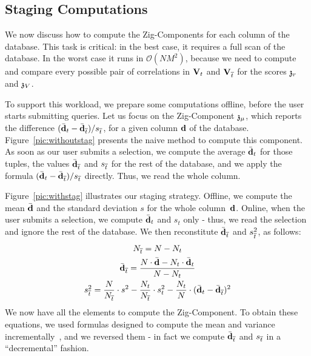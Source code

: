 \subsection{Staging Computations}
\label{sec:optimization}
We now discuss how to compute the Zig-Components for each column of the
database. This task is critical: in the best case, it requires a full scan of
the database. In the worst case it runs in $\mathcal{O}(NM^2)$, because
we need to compute and compare every possible pair of correlations in
$\mathbf{V}_t$ and $\mathbf{V}_{\overline{t}}$ for the scores $\mathfrak{z}_r$ and $\mathfrak{z}_V$.

To support this workload, we prepare some computations offline, before the user
starts submitting queries.  Let us focus on the Zig-Component $\mathfrak{z}_\mu$,
which reports the difference $(\bar{\bf{d}}_t -
\bar{\bf{d}}_{\overline{t}})/{s_{\overline{t}}}$, for a given column $\bf{d}$ of the
database.  Figure~\ref{pic:withoutstag} presents the naive method to compute
this component.  As soon as our user submits a selection, we compute the
average $\bar{\bf{d}}_t$ for those tuples, the values $\bar{\bf{d}}_{\overline{t}}$
and $s_{\overline{t}}$ for the rest of the database, and we apply the formula
$(\bar{\bf{d}}_t - \bar{\bf{d}}_{\overline{t}})/{s_{\overline{t}}}$ directly. Thus, we read
the whole column.

Figure~\ref{pic:withstag} illustrates our staging strategy. Offline, we compute
the mean $\bar{\bf{d}}$ and the standard deviation $s$ for the whole
column~$\bf{d}$. Online, when the user submits a selection, we compute
$\bar{\bf{d}}_t$ and $s_t$
only - thus, we read the selection and ignore the rest of the database. We then
reconstitute $\bar{\bf{d}}_{\overline{t}}$ and $s_{\overline{t}}^2$, as follows:
\begin{gather}
    N_{\overline{t}} = N - N_t\\
    \bar{\bf{d}}_{\overline{t}}= \frac{ N \cdot \bar{\bf{d}} -  N_t \cdot \bar{\bf{d}}_t } { N - N_t } \\
    s_{\overline{t}}^2 = \frac{N}{N_{\overline{t}}} \cdot s^2 - \frac{N_t}{N_{\overline{t}}} \cdot s_t^2 -
    \frac{N_t}{N} \cdot (\bar{\bf{d}}_t -  \bar{\bf{d}}_{\overline{t}})^2 
\end{gather}
We now have all the elements to compute the Zig-Component. To obtain these
equations, we used formulas designed to compute the mean and variance
incrementally~\cite{pebay2008formulas}, and we reversed them - in fact we
compute $\bar{\bf{d}}_{\overline{t}}$ and $s_{\overline{t}}$ in a ``decremental'' fashion.

